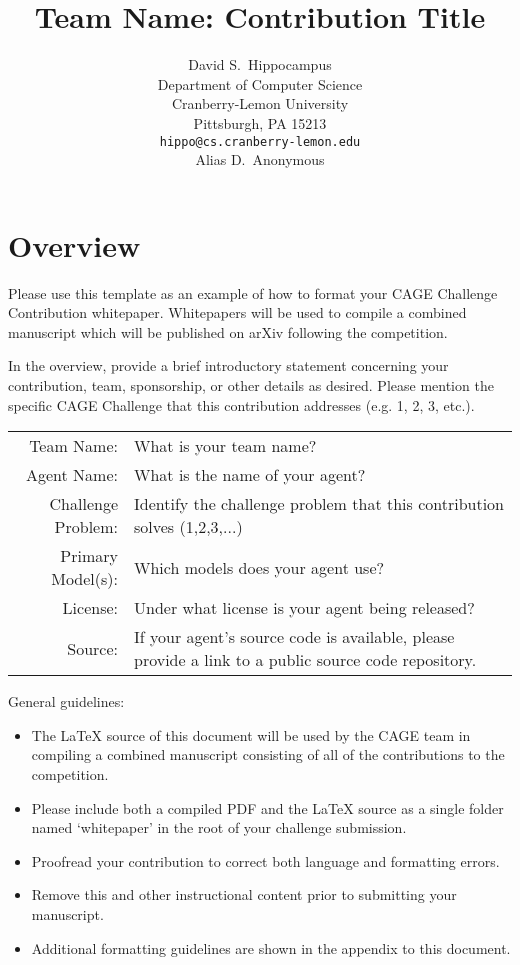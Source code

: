 \documentclass{article}
\title{Team Name: Contribution Title}
\date{} 					%
\author{ David S.~Hippocampus \\
	Department of Computer Science\\
	Cranberry-Lemon University\\
	Pittsburgh, PA 15213 \\
	\texttt{hippo@cs.cranberry-lemon.edu} \\
	\And
	Alias D.~Anonymous \\
}
\date{}
\begin{document}
\maketitle


\section{Overview}
Please use this template as an example of how to format your CAGE Challenge Contribution whitepaper.  Whitepapers will be used to compile a combined manuscript which will be published on arXiv following the competition. 

In the overview, provide a brief introductory statement concerning your contribution, team, sponsorship, or other details as desired.  Please mention the specific CAGE Challenge that this contribution addresses (e.g. 1, 2, 3, etc.).

\begin{table}[h!]
    \centering
    \begin{tabular}{rl}
    \toprule
     Team Name: & What is your team name? \\[0.25em]
     Agent Name: & What is the name of your agent? \\[0.25em]
     Challenge Problem: & Identify the challenge problem that this contribution solves (1,2,3,...) \\[0.25em] 
     Primary Model(s): & Which models does your agent use? \\[0.25em]
     License: & Under what license is your agent being released? \\[0.25em]
     Source: & If your agent's source code is available, please provide a link to a public source code repository. \\
     \bottomrule
    \end{tabular}
    \label{tab:my_label}
\end{table}

General guidelines:
\begin{itemize}
    \item The LaTeX source of this document will be used by the CAGE team in compiling a combined manuscript consisting of all of the contributions to the competition. 
    \item Please include both a compiled PDF and the LaTeX source as a single folder named `whitepaper' in the root of your challenge submission.  
    \item Proofread your contribution to correct both language and formatting errors.
    \item Remove this and other instructional content prior to submitting your manuscript.
    \item Additional formatting guidelines are shown in the appendix to this document. 
\end{itemize}
\end{document}
